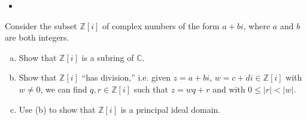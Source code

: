 \documentclass{article}
\newcounter{Problem}
\newenvironment{Problem}{\begin{Exercise}[name={Problem},
                                          counter={Problem}]}
                        {\end{Exercise}}
\begin{document}
\begin{Answer}
\begin{enumerate}[(a)]
{\begin{itemize}
{          Suppose for some $n > 0$ that $b_k = 0$ for
          $0 \leq k < n-1$. Then
          \begin{align*}
            0 = (ab)_{n + r_0}
             &= \sum_{k=0}^{n + r_0} a_k b_{n + r_0 - k} \\
             &= a_0 b_{n + r_0}
              + a_1 b_{n + r_0 - 1}
              + \cdots
              + a_{r_0} b_n
              + a_{r_0 + 1} b_{n - 1}
              + \cdots
              + a_{n + r_0} b_0 \\
             &= \sum_{k=0}^{r_0 - 1} a_k b_{r_0 - 1 - k}
              + a_{r_0} b_n
              + \sum_{k=1}^{n} a_{r_0 + k} b_{n - k} \\
             &= 0 + a_{r_0} b_n + 0
          \end{align*}
          so that $b_n = 0$ since $A$ is an integral domain.

          Therefore $a b = 0$ implies $a = 0$ or $b = 0$, so $A[[x]]$
          is an integral domain.
        }
        \item{

        }
      \end{itemize}
    }
  \end{enumerate}
\end{Answer}

\pagebreak

\begin{Problem}
  Consider the subset $\mathbb{Z}[i]$ of complex numbers of the form
  $a + bi$, where $a$ and $b$ are both integers.
  \begin{enumerate}[(a)]
    \item{
      Show that $\mathbb{Z}[i]$ is a subring of $\mathbb{C}$.
    }
    \item{
      Show that $\mathbb{Z}[i]$ ``has division,'' i.e. given
      $z = a + bi$, $w = c + di \in \mathbb{Z}[i]$ with $w \neq 0$, we
      can find $q, r \in \mathbb{Z}[i]$ such that $z = wq + r$ and
      with $0 \leq |r| < |w|$.
    }
    \item{
      Use (b) to show that $\mathbb{Z}[i]$ is a principal ideal domain.
    }
  \end{enumerate}
\end{Problem}
\end{document}
